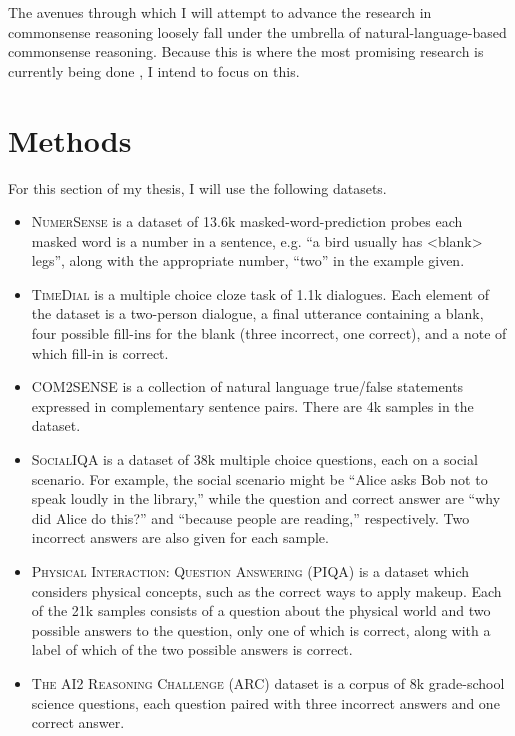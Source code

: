 \documentclass[12pt]{report}
\begin{document}
The avenues through which I will attempt to advance the research in commonsense reasoning loosely fall under the umbrella of natural-language-based commonsense reasoning.
Because this is where the most promising research is currently being done \cite{Choi2022-to}, I intend to focus on this.

\section{Methods}

For this section of my thesis, I will use the following datasets.

\begin{itemize}
    \item
        \textsc{NumerSense} \cite{Lin2020-ik} is a dataset of 13.6k masked-word-prediction probes each masked word is a number in a sentence, e.g. \enquote{a bird usually has <blank> legs}, along with the appropriate number, \enquote{two} in the example given.
    \item
        \textsc{TimeDial} \cite{Qin2021-jy} is a multiple choice cloze task of 1.1k dialogues. Each element of the dataset is a two-person dialogue, a final utterance containing a blank, four possible fill-ins for the blank (three incorrect, one correct), and a note of which fill-in is correct.
    \item
        \textsc{COM2SENSE} \cite{Singh2021-ui} is a collection of natural language true/false statements expressed in complementary sentence pairs. There are 4k samples in the dataset.
    \item
        \textsc{SocialIQA} \cite{Sap2019-hu} is a dataset of 38k multiple choice questions, each on a social scenario.
        For example, the social scenario might be \enquote{Alice asks Bob not to speak loudly in the library,} while the question and correct answer are \enquote{why did Alice do this?} and \enquote{because people are reading,} respectively.
        Two incorrect answers are also given for each sample.
    \item
        \textsc{Physical Interaction: Question Answering (PIQA)} \cite{Bisk2020-hw} is a dataset which considers physical concepts, such as the correct ways to apply makeup.
        Each of the 21k samples consists of a question about the physical world and two possible answers to the question, only one of which is correct, along with a label of which of the two possible answers is correct.
    \item
        \textsc{The AI2 Reasoning Challenge (ARC)} \cite{Clark2018-md} dataset is a corpus of 8k grade-school science questions, each question paired with three incorrect answers and one correct answer.

\end{itemize}
\end{document}
